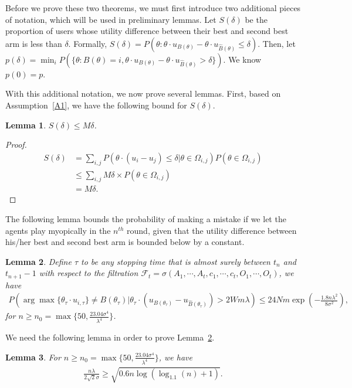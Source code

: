 \documentclass{article}
\newtheorem{lemma}{Lemma}
\begin{document}
Before we prove these two theorems, we must first introduce two additional pieces of notation, which will be used in preliminary lemmas.  Let $S(\delta)$ be the proportion of users whose utility difference between their best and second best arm is less than $\delta$. Formally, $S(\delta)=P(\theta: \theta \cdot u_{B(\theta)}-\theta\cdot u_{\hat{B}(\theta)}\leq \delta)$. Then, let $p(\delta)=\min_{i}P(\{\theta:B(\theta)=i,\theta\cdot u_{B(\theta)}-\theta\cdot u_{\hat{B}(\theta)}>\delta\})$. We know $p(0)=p$. 

With this additional notation, we now prove several lemmas.
First, based on Assumption~\ref{A1}, we have the following bound for $S(\delta)$.

\begin{lemma}
$S(\delta)\leq M\delta$.
\label{lemma:sdelta}
\end{lemma}

\begin{proof}
\begin{align*}
S(\delta)
&=\sum_{i,j}P(\theta\cdot(u_{i}-u_{j})\le \delta|\theta\in \Omega_{i,j})P(\theta\in \Omega_{i,j}) \\
&\leq \sum_{i,j}M\delta \times P(\theta\in \Omega_{i,j}) \\
&=M\delta.
\end{align*}
\end{proof}

The following lemma bounds the probability of making a mistake if we let the agents play myopically in the $n^{th}$ round, given that the utility difference between his/her best and second best arm is bounded below by a constant. 

\begin{lemma}
Define $\tau$ to be any stopping time that is almost surely between $t_n$ and $t_{n+1}-1$ with respect to the filtration $\mathcal{F}_{t}=\sigma(A_1,\cdots,A_t,c_1,\cdots,c_t,O_1,\cdots,O_t)$, we have 
\begin{align}
P(\arg\max\{\theta_{\tau}\cdot u_{i,\tau}\}\neq B(\theta_{\tau})|\theta_{\tau}\cdot(u_{B(\theta_{\tau})}-u_{\hat{B}(\theta_{\tau})})> 2Wm\lambda)\leq 24Nm\exp\left(-\frac{1.8n\lambda^2}{8\sigma^2}\right), \nonumber
\end{align}
for $n\geq n_{0}=\max\{50, \frac{23.04\sigma^4}{\lambda^4}\}$.
\label{round:prob}
\end{lemma}


We need the following lemma in order to prove Lemma~\ref{round:prob}.

\begin{lemma}
For $n\geq n_{0}=\max\{50, \frac{23.04\sigma^4}{\lambda^4}\}$, we have
\begin{align}
\frac{n\lambda}{2\sqrt{2}\sigma}\geq \sqrt{0.6n\log(\log_{1.1}(n)+1)}. \nonumber
\end{align}
\label{n0-inequality}
\end{lemma}
\end{document}
